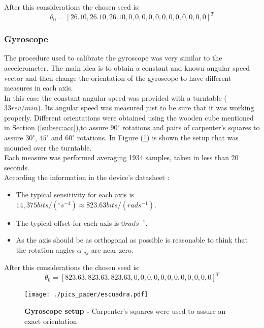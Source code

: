 \documentclass[conference]{IEEEtran}
\newcommand{\refp}[1]{(\ref{#1})}
\begin{document}
After this considerations the chosen seed is:
\begin{equation}
{\theta}_0 = [26.10, 26.10, 26.10, 0, 0, 0, 0, 0, 0, 0, 0, 0, 0, 0, 0]^T
\end{equation}
\subsubsection{Gyroscope}

The procedure used to calibrate the gyroscope was very similar to the accelerometer. The main idea is to obtain a constant and known angular speed vector and then change the orientation of the gyroscope to have different measures in each axis.\\

In this case the constant angular speed was provided with a turntable ($33 rev/min$). Its angular speed was measured just to be sure that it was working properly. Different orientations were obtained using the wooden cube mentioned in Section \refp{subsec:acc},to assure $90^\circ$ rotations and pairs of carpenter's squares to assure $30^\circ$, $45^\circ$ and $60^\circ$ rotations. In Figure \refp{fig:setup_gyro} is shown the setup that was mounted over the turntable.\\

Each measure was performed averaging 1934 samples, taken in less than 20 seconds.\\

According the information in the device's datasheet \cite{bib:gyro_data}:

\begin{itemize}
\item The typical sensitivity for each axis is $14,375 bits/(^\circ s^{-1})\approx 823.63 bits/(rad s^{-1})$.
\item The typical offset for each axis is $0 rad s^{-1}$.
\item As the axis should be as orthogonal as possible is reasonable to think that the rotation angles $\alpha_{\omega ij}$ are near zero. 
\end{itemize}

After this considerations the chosen seed is:
\begin{equation}
{\theta}_0 = [823.63, 823.63, 823.63, 0, 0, 0, 0, 0, 0, 0, 0, 0, 0, 0, 0]^T
\end{equation}

\begin{figure}
	\centering
	\texttt{[image: ./pics\_paper/escuadra.pdf]}
	\caption{\textbf{Gyroscope setup - }Carpenter's squares were used to assure an exact orientation}
	\label{fig:setup_gyro}
\end{figure}
\end{document}
